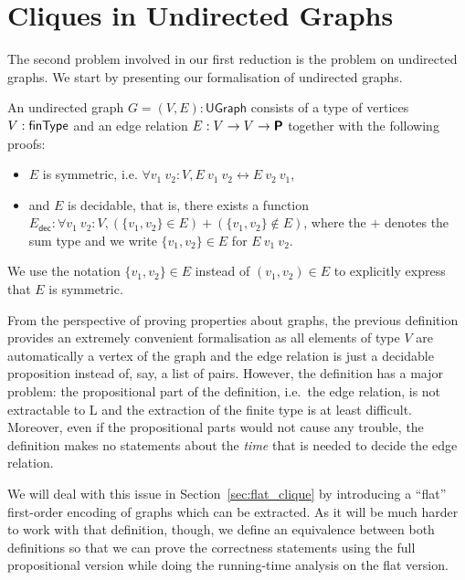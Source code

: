 \newcommand{\UGraph}{\textsf{UGraph}}
\newcommand{\Edec}{\ensuremath{E_\textsf{dec}}}
\section{Cliques in Undirected Graphs}\label{sec:clique}
The second problem involved in our first reduction is the \Clique{} problem on undirected graphs. We start by presenting our formalisation of undirected graphs.

\begin{definition}
  An undirected graph $G = (V, E) : \UGraph$\mnote[UGraph]{\UGraph} consists of a type of vertices $V : \textsf{finType}$ and an edge relation $E : V \rightarrow V \rightarrow \textsf{\bfseries P}$ together with the following proofs:
  \begin{itemize}
    \item $E$ is symmetric, i.e. $\forall v_1~v_2 : V, E~v_1~v_2 \leftrightarrow E~v_2~v_1$, 
    \item and $E$ is decidable, that is, there exists a function $\Edec : \forall v_1~v_2 : V, (\{v_1, v_2\} \in E) + (\{v_1, v_2\} \notin E)$, where the $+$ denotes the sum type and we write $\{v_1, v_2\} \in E$ for $E~v_1~v_2$.
  \end{itemize}
  We use the notation $\{v_1, v_2\} \in E$ instead of $(v_1, v_2) \in E$ to explicitly express that $E$ is symmetric.
\end{definition}

\begin{remark}\label{rem:ugraph}
  From the perspective of proving properties about graphs, the previous definition provides an extremely convenient formalisation as all elements of type $V$ are automatically a vertex of the graph and the edge relation is just a decidable proposition instead of, say, a list of pairs. 
  However, the definition has a major problem: the propositional part of the definition, i.e.\ the edge relation, is not extractable to L and the extraction of the finite type is at least difficult. Moreover, even if the propositional parts would not cause any trouble, the definition makes no statements about the \emph{time} that is needed to decide the edge relation. 

  We will deal with this issue in Section~\ref{sec:flat_clique} by introducing a ``flat'' first-order encoding of graphs which can be extracted. 
  As it will be much harder to work with that definition, though, we define an equivalence between both definitions so that we can prove the correctness statements using the full propositional version while doing the running-time analysis on the flat version.
\end{remark}

